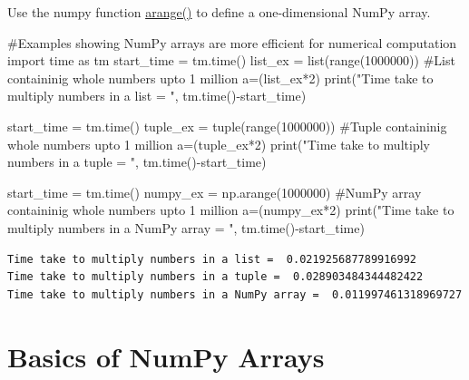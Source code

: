 \documentclass[
  letterpaper,
  DIV=11,
  numbers=noendperiod]{scrreprt}
\newenvironment{Shaded}{\begin{snugshade}}{\end{snugshade}}
\newcommand{\BuiltInTok}[1]{\textcolor[rgb]{0.00,0.23,0.31}{#1}}
\newcommand{\CommentTok}[1]{\textcolor[rgb]{0.37,0.37,0.37}{#1}}
\newcommand{\DecValTok}[1]{\textcolor[rgb]{0.68,0.00,0.00}{#1}}
\newcommand{\ImportTok}[1]{\textcolor[rgb]{0.00,0.46,0.62}{#1}}
\newcommand{\NormalTok}[1]{\textcolor[rgb]{0.00,0.23,0.31}{#1}}
\newcommand{\OperatorTok}[1]{\textcolor[rgb]{0.37,0.37,0.37}{#1}}
\newcommand{\StringTok}[1]{\textcolor[rgb]{0.13,0.47,0.30}{#1}}
\begin{document}
Use the numpy function
\href{https://numpy.org/doc/stable/reference/generated/numpy.arange.html}{arange()}
to define a one-dimensional NumPy array.

\begin{Shaded}
\begin{Highlighting}[]
\CommentTok{\#Examples showing NumPy arrays are more efficient for numerical computation}
\ImportTok{import}\NormalTok{ time }\ImportTok{as}\NormalTok{ tm}
\NormalTok{start\_time }\OperatorTok{=}\NormalTok{ tm.time()}
\NormalTok{list\_ex }\OperatorTok{=} \BuiltInTok{list}\NormalTok{(}\BuiltInTok{range}\NormalTok{(}\DecValTok{1000000}\NormalTok{)) }\CommentTok{\#List containinig whole numbers upto 1 million}
\NormalTok{a}\OperatorTok{=}\NormalTok{(list\_ex}\OperatorTok{*}\DecValTok{2}\NormalTok{)}
\BuiltInTok{print}\NormalTok{(}\StringTok{"Time take to multiply numbers in a list = "}\NormalTok{, tm.time()}\OperatorTok{{-}}\NormalTok{start\_time)}

\NormalTok{start\_time }\OperatorTok{=}\NormalTok{ tm.time()}
\NormalTok{tuple\_ex }\OperatorTok{=} \BuiltInTok{tuple}\NormalTok{(}\BuiltInTok{range}\NormalTok{(}\DecValTok{1000000}\NormalTok{)) }\CommentTok{\#Tuple containinig whole numbers upto 1 million}
\NormalTok{a}\OperatorTok{=}\NormalTok{(tuple\_ex}\OperatorTok{*}\DecValTok{2}\NormalTok{)}
\BuiltInTok{print}\NormalTok{(}\StringTok{"Time take to multiply numbers in a tuple = "}\NormalTok{, tm.time()}\OperatorTok{{-}}\NormalTok{start\_time)}

\NormalTok{start\_time }\OperatorTok{=}\NormalTok{ tm.time()}
\NormalTok{numpy\_ex }\OperatorTok{=}\NormalTok{ np.arange(}\DecValTok{1000000}\NormalTok{) }\CommentTok{\#NumPy array containinig whole numbers upto 1 million}
\NormalTok{a}\OperatorTok{=}\NormalTok{(numpy\_ex}\OperatorTok{*}\DecValTok{2}\NormalTok{)}
\BuiltInTok{print}\NormalTok{(}\StringTok{"Time take to multiply numbers in a NumPy array = "}\NormalTok{, tm.time()}\OperatorTok{{-}}\NormalTok{start\_time)}
\end{Highlighting}
\end{Shaded}

\begin{verbatim}
Time take to multiply numbers in a list =  0.021925687789916992
Time take to multiply numbers in a tuple =  0.028903484344482422
Time take to multiply numbers in a NumPy array =  0.011997461318969727
\end{verbatim}

\hypertarget{basics-of-numpy-arrays}{%
\section{Basics of NumPy Arrays}\label{basics-of-numpy-arrays}}
\end{document}
